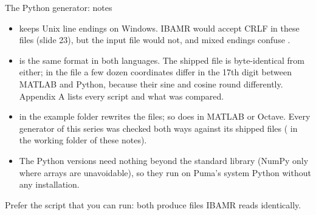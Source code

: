 \documentclass[aspectratio=169,11pt]{beamer}
\begin{document}
\begin{frame}{The Python generator: notes}
\begin{itemize}
  \item {} keeps Unix line endings on Windows. IBAMR would accept CRLF in these files (slide 23), but the input file would not, and mixed endings confuse .
  \item {} is the same format in both languages. The shipped  file is byte-identical from either; in the  file a few dozen coordinates differ in the 17th digit between MATLAB and Python, because their sine and cosine round differently. Appendix A lists every script and what was compared.
  \item {} in the example folder rewrites the files; so does  in MATLAB or Octave. Every generator of this series was checked both ways against its shipped files ( in the working folder of these notes).
  \item The Python versions need nothing beyond the standard library (NumPy only where arrays are unavoidable), so they run on Puma's system Python without any installation.
\end{itemize}
\vspace{2mm}
\begin{punchbox}
\small Prefer the script that you can run: both produce files IBAMR reads identically.
\end{punchbox}
\end{frame}
\end{document}
